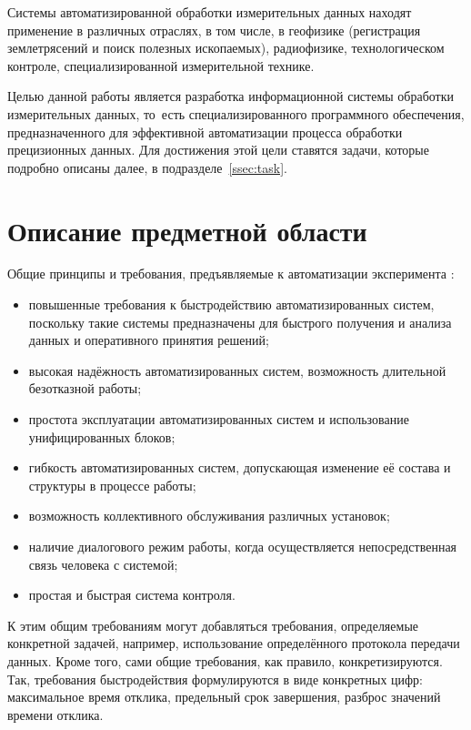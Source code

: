 \documentclass[a4paper, 14pt]{extarticle}
\begin{document}
  Системы автоматизированной обработки измерительных данных находят применение в различных отраслях,
  в том числе, в геофизике (регистрация землетрясений и поиск полезных ископаемых), радиофизике,
  технологическом контроле, специализированной измерительной технике.

  Целью данной работы является разработка информационной системы обработки измерительных данных,
  то~есть специализированного программного обеспечения, предназначенного для эффективной
  автоматизации процесса обработки прецизионных данных. Для достижения этой цели ставятся задачи,
  которые подробно описаны далее, в подразделе~\ref{ssec:task}.

  \section{Описание предметной области}

  Общие принципы и требования, предъявляемые к автоматизации эксперимента \cite{vinogradov-discrete, kurochkin-kamak}:
  \begin{itemize}
    \item повышенные требования к быстродействию автоматизированных систем, поскольку такие системы
      предназначены для быстрого получения и анализа данных и оперативного принятия решений;
    \item высокая надёжность автоматизированных систем, возможность длительной безотказной работы;
    \item простота эксплуатации автоматизированных систем и использование унифицированных блоков;
    \item гибкость автоматизированных систем, допускающая изменение её состава и структуры в процессе работы;
    \item возможность коллективного обслуживания различных установок;
    \item наличие диалогового режим работы, когда осуществляется непосредственная связь человека с системой;
    \item простая и быстрая система контроля.
  \end{itemize}

  К этим общим требованиям могут добавляться требования, определяемые конкретной задачей, например,
  использование определённого протокола передачи данных. Кроме того, сами общие требования, как
  правило, конкретизируются. Так, требования быстродействия формулируются в виде конкретных цифр:
  максимальное время отклика, предельный срок завершения, разброс значений времени отклика.
\end{document}
